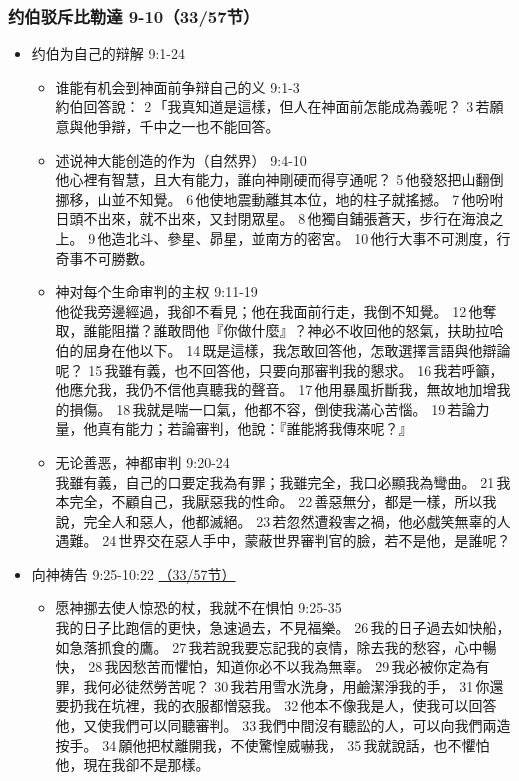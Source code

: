 \subsubsection{约伯驳斥比勒達 9-10（33/57节）}
\begin{itemize}
\itemsep-.45em
\item 约伯为自己的辩解 9:1-24
\begin{itemize}
\itemsep-.45em
\item 谁能有机会到神面前争辩自己的义 9:1-3\\
約伯回答說： 2 「我真知道是這樣，但人在神面前怎能成為義呢？ 3 若願意與他爭辯，千中之一也不能回答。
\item 述说神大能创造的作为（自然界） 9:4-10\\
他心裡有智慧，且大有能力，誰向神剛硬而得亨通呢？ 5 他發怒把山翻倒挪移，山並不知覺。 6 他使地震動離其本位，地的柱子就搖撼。 7 他吩咐日頭不出來，就不出來，又封閉眾星。 8 他獨自鋪張蒼天，步行在海浪之上。 9 他造北斗、參星、昴星，並南方的密宮。 10 他行大事不可測度，行奇事不可勝數。
\item 神对每个生命审判的主权 9:11-19\\
他從我旁邊經過，我卻不看見；他在我面前行走，我倒不知覺。 12 他奪取，誰能阻擋？誰敢問他『你做什麼』？神必不收回他的怒氣，扶助拉哈伯的屈身在他以下。 14 既是這樣，我怎敢回答他，怎敢選擇言語與他辯論呢？ 15 我雖有義，也不回答他，只要向那審判我的懇求。 16 我若呼籲，他應允我，我仍不信他真聽我的聲音。 17 他用暴風折斷我，無故地加增我的損傷。 18 我就是喘一口氣，他都不容，倒使我滿心苦惱。 19 若論力量，他真有能力；若論審判，他說：『誰能將我傳來呢？』
\item 无论善恶，神都审判 9:20-24\\
我雖有義，自己的口要定我為有罪；我雖完全，我口必顯我為彎曲。 21 我本完全，不顧自己，我厭惡我的性命。 22 善惡無分，都是一樣，所以我說，完全人和惡人，他都滅絕。 23 若忽然遭殺害之禍，他必戲笑無辜的人遇難。 24 世界交在惡人手中，蒙蔽世界審判官的臉，若不是他，是誰呢？
\end{itemize}
\item 向神祷告 9:25-10:22 \underline{（33/57节）}
\begin{itemize}
\itemsep-.45em
\item 愿神挪去使人惊恐的杖，我就不在惧怕 9:25-35\\
我的日子比跑信的更快，急速過去，不見福樂。 26 我的日子過去如快船，如急落抓食的鷹。 27 我若說我要忘記我的哀情，除去我的愁容，心中暢快， 28 我因愁苦而懼怕，知道你必不以我為無辜。 29 我必被你定為有罪，我何必徒然勞苦呢？ 30 我若用雪水洗身，用鹼潔淨我的手， 31 你還要扔我在坑裡，我的衣服都憎惡我。 32 他本不像我是人，使我可以回答他，又使我們可以同聽審判。 33 我們中間沒有聽訟的人，可以向我們兩造按手。 34 願他把杖離開我，不使驚惶威嚇我， 35 我就說話，也不懼怕他，現在我卻不是那樣。

\end{itemize}
\end{itemize}
